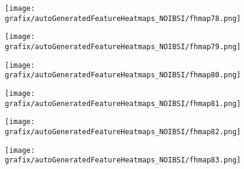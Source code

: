 \hspace{\hsp} 
\begin{subfigure}{\wid\textwidth} 
    \centering 
    \caption{\tiny \sffamily {}} 
    \vspace{\vsp} 
    \texttt{[image: grafix/autoGeneratedFeatureHeatmaps\_NOIBSI/fhmap78.png]} 
\end{subfigure} 
\hspace{\hsp} 
\begin{subfigure}{\wid\textwidth} 
    \centering 
    \caption{\tiny \sffamily {}} 
    \vspace{\vsp} 
    \texttt{[image: grafix/autoGeneratedFeatureHeatmaps\_NOIBSI/fhmap79.png]} 
\end{subfigure} 
\hspace{\hsp} 
\begin{subfigure}{\wid\textwidth} 
    \centering 
    \caption{\tiny \sffamily {}} 
    \vspace{\vsp} 
    \texttt{[image: grafix/autoGeneratedFeatureHeatmaps\_NOIBSI/fhmap80.png]} 
\end{subfigure} 
\hspace{\hsp} 
\begin{subfigure}{\wid\textwidth} 
    \centering 
    \caption{\tiny \sffamily {}} 
    \vspace{\vsp} 
    \texttt{[image: grafix/autoGeneratedFeatureHeatmaps\_NOIBSI/fhmap81.png]} 
\end{subfigure} 
\hspace{\hsp} 
\begin{subfigure}{\wid\textwidth} 
    \centering 
    \caption{\tiny \sffamily {}} 
    \vspace{\vsp} 
    \texttt{[image: grafix/autoGeneratedFeatureHeatmaps\_NOIBSI/fhmap82.png]} 
\end{subfigure} 
\hspace{\hsp} 
\begin{subfigure}{\wid\textwidth} 
    \centering 
    \caption{\tiny \sffamily {}} 
    \vspace{\vsp} 
    \texttt{[image: grafix/autoGeneratedFeatureHeatmaps\_NOIBSI/fhmap83.png]} 
\end{subfigure} 
\hspace{\hsp} 
